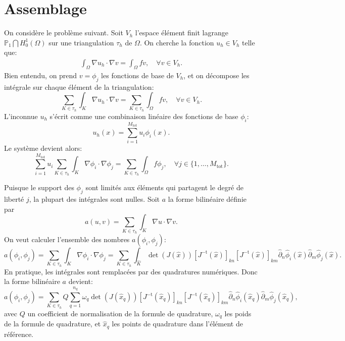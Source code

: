 \section{Assemblage}
On considère le problème suivant. Soit $V_h$ l'espace élément finit lagrange $\mathbb P_1\bigcap H^1_0(\Omega)$ sur une triangulation $\tau_h$ de $\Omega$. On cherche la fonction $u_h\in V_h$ telle que:
\begin{align}
  \int_\Omega \nabla u_h\cdot \nabla v = \int_\Omega f v,\quad \forall v \in V_h.
\end{align}
Bien entendu, on prend $v = \phi_j$ les fonctions de base de $V_h$, et on décompose les intégrale sur chaque élément de la triangulation:
\begin{equation}
  \sum_{K\in\tau_h}\int_K \nabla u_h\cdot \nabla v = \sum_{K \in \tau_h}\int_\Omega f v, \quad \forall v \in V_h.
\end{equation}
L'inconnue $u_h$ s'écrit comme une combinaison linéaire des fonctions de base $\phi_i$:
\begin{equation}
  u_h(x) = \sum_{i = 1}^{M_\text{tot}} u_i \phi_i(x).
\end{equation}
Le système devient alors:
\begin{equation}
  \sum_{i = 1}^{M_\text{tot}}u_i\sum_{K\in\tau_h}\int_K \nabla \phi_i\cdot \nabla \phi_j = \sum_{K \in \tau_h}\int_\Omega f \phi_j, \quad \forall j \in \{1, \dots,M_\text{tot}\}.
\end{equation}

Puisque le support des $\phi_j$ sont limités aux éléments qui partagent le degré de liberté $j$, la plupart des intégrales sont nulles. Soit $a$ la forme bilinéaire définie par
\begin{equation}
a(u, v) = \sum_{K\in\tau_h}\int_K \nabla u\cdot \nabla v.
\end{equation}
On veut calculer l'ensemble des nombres $a(\phi_i, \phi_j)$:
\begin{equation}
a(\phi_i, \phi_j) = \sum_{K\in\tau_h}\int_K \nabla \phi_i\cdot \nabla \phi_j = \sum_{K\in\tau_h}\int_{\hat K} \det(J(\hat x)) [J^{-\mathrm t}(\hat x)]_{kn} [J^{-\mathrm t}(\hat x)]_{km} \hat\partial_n \hat\phi_i(\hat x)\hat\partial_m \hat\phi_j(\hat x).
\end{equation}
En pratique, les intégrales sont remplacées par des quadratures numériques. Donc la forme bilinéaire $a$ devient:
\begin{equation}
a(\phi_i, \phi_j) = \sum_{K\in\tau_h} Q \sum_{q = 1}^{n_q}\omega_q \det(J(\hat x_q)) [J^{-\mathrm t}(\hat x_q)]_{kn} [J^{-\mathrm t}(\hat x_q)]_{km} \hat\partial_n \hat\phi_i(\hat x_q)\hat\partial_m \hat\phi_j(\hat x_q),
\end{equation}
avec $Q$ un coefficient de normalisation de la formule de quadrature, $\omega_q$ les poids de la formule de quadrature, et $\hat x_q$ les points de quadrature dans l'élément de référence.

